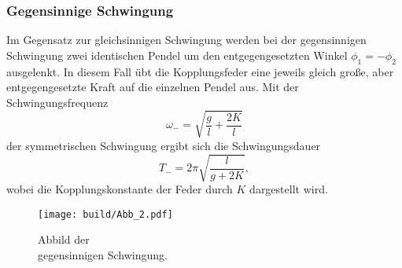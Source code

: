 \subsubsection{Gegensinnige Schwingung}

\begin{minipage}[t]{0.5\textwidth}
\label{subsec:Gegen}
Im Gegensatz zur gleichsinnigen Schwingung werden bei der gegensinnigen Schwingung zwei identischen Pendel um den entgegengesetzten Winkel $\phi_1 = -\phi_2$ ausgelenkt.
In diesem Fall übt die Kopplungsfeder eine jeweils gleich große, aber entgegengesetzte Kraft auf die einzelnen Pendel aus.
Mit der Schwingungsfrequenz
\begin{equation}
    \omega_- = \sqrt{\frac{g}{l} + \frac{2K}{l}}
    \label{eqn:omega-}
\end{equation}
der symmetrischen Schwingung ergibt sich die Schwingungsdauer
\begin{equation}
    T_- = 2\pi \sqrt{\frac{l}{g+2K}},
    \label{eqn:T-}
\end{equation}
wobei die Kopplungskonstante der Feder durch $K$ dargestellt wird.
\end{minipage}
\begin{minipage}[t]{0.5\textwidth}
    \begin{figure}[H]
        \centering
        \texttt{[image: build/Abb\_2.pdf]}
        \caption{Abbild der \\gegensinnigen Schwingung. \cite{V106}}
        \label{fig:gegen}
      \end{figure}
\end{minipage}
